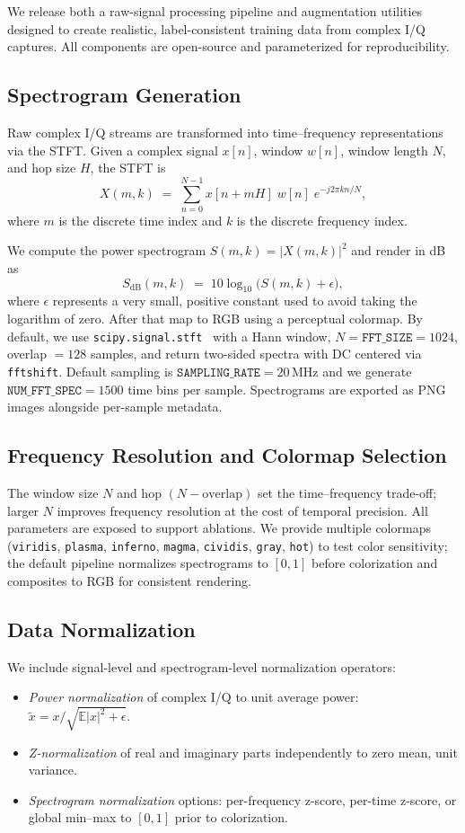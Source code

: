 We release both a raw-signal processing pipeline and augmentation utilities designed to create realistic, label-consistent training data from complex I/Q captures. All components are open-source and parameterized for reproducibility.

\subsection{Spectrogram Generation}
Raw complex I/Q streams are transformed into time–frequency representations via the STFT. Given a complex signal $x[n]$, window $w[n]$, window length $N$, and hop size $H$, the STFT is ~\cite{oppenheim1999discrete}
\[
X(m,k) \;=\; \sum_{n=0}^{N-1} x[n+mH]\; w[n]\; e^{-j 2\pi kn/N},
\]
where $m$ is the discrete time index and $k$ is the discrete frequency index.

We compute the power spectrogram $S(m,k) = \lvert X(m,k)\rvert^2$ and render in dB as
\[
S_{\mathrm{dB}}(m,k) \;=\; 10\log_{10}\big(S(m,k)+\epsilon\big),
\]
where $\epsilon$ represents a very small, positive constant used to avoid taking the logarithm of zero. After that map to RGB using a perceptual colormap. By default, we use \texttt{scipy.signal.stft}~\cite{virtanen2020scipy} with a Hann window, $N=\texttt{FFT\_SIZE}=1024$, overlap $=128$ samples, and return two-sided spectra with DC centered via \texttt{fftshift}. Default sampling is $\texttt{SAMPLING\_RATE}=20$\,MHz and we generate $\texttt{NUM\_FFT\_SPEC}=1500$ time bins per sample. Spectrograms are exported as PNG images alongside per-sample metadata.

\subsection{Frequency Resolution and Colormap Selection}
The window size $N$ and hop $(N-\text{overlap})$ set the time–frequency trade-off; larger $N$ improves frequency resolution at the cost of temporal precision. All parameters are exposed to support ablations. We provide multiple colormaps (\texttt{viridis}, \texttt{plasma}, \texttt{inferno}, \texttt{magma}, \texttt{cividis}, \texttt{gray}, \texttt{hot}) to test color sensitivity; the default pipeline normalizes spectrograms to $[0,1]$ before colorization and composites to RGB for consistent rendering.

\subsection{Data Normalization}
We include signal-level and spectrogram-level normalization operators:
\begin{itemize}
    \item \emph{Power normalization} of complex I/Q to unit average power: $\tilde{x}=x/\sqrt{\mathbb{E}\lvert x\rvert^2+\epsilon}$.
    \item \emph{Z-normalization} of real and imaginary parts independently to zero mean, unit variance.
    \item \emph{Spectrogram normalization} options: per-frequency z-score, per-time z-score, or global min–max to $[0,1]$ prior to colorization.
\end{itemize}

